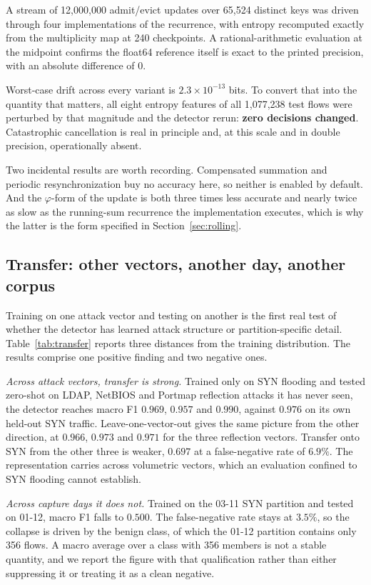\documentclass{ieeeaccess}
\begin{document}
A stream of 12{,}000{,}000 admit/evict updates over 65{,}524 distinct keys was
driven through four implementations of the recurrence, with entropy
recomputed exactly from the multiplicity map at 240 checkpoints. A rational-arithmetic evaluation at the
midpoint confirms the float64 reference itself is exact to the printed
precision, with an absolute difference of $0$.

Worst-case drift across every variant is $2.3\times10^{-13}$ bits. To convert
that into the quantity that matters, all eight entropy features of all
1{,}077{,}238 test flows were perturbed by that magnitude and the detector rerun:
\textbf{zero decisions changed}. Catastrophic cancellation is real in principle
and, at this scale and in double precision, operationally absent.

Two incidental results are worth recording. Compensated summation and periodic
resynchronization buy no accuracy here, so neither is enabled by default. And the $\varphi$-form of the update is both three times less accurate and
nearly twice as slow as the running-sum recurrence the implementation
executes, which is why the latter is the form specified in
Section~\ref{sec:rolling}.

\subsection{Transfer: other vectors, another day, another corpus}
\label{sec:crossvector}
\label{sec:crossdataset}
Training on one attack vector and testing on another is the first real test of
whether the detector has learned attack structure or partition-specific detail.
Table~\ref{tab:transfer} reports three distances from the training distribution.
The results comprise one positive finding and two negative ones.

\emph{Across attack vectors, transfer is strong.} Trained only on SYN flooding
and tested zero-shot on LDAP, NetBIOS and Portmap reflection attacks it has never
seen, the detector reaches macro F1 $0.969$, $0.957$ and $0.990$, against $0.976$
on its own held-out SYN traffic. Leave-one-vector-out gives the same picture from
the other direction, at $0.966$, $0.973$ and $0.971$ for the three reflection
vectors. Transfer onto SYN from the other three is weaker, $0.697$ at a
false-negative rate of $6.9\%$. The representation carries across volumetric vectors, which an evaluation
confined to SYN flooding cannot establish.

\emph{Across capture days it does not.} Trained on the 03-11 SYN partition and
tested on 01-12, macro F1 falls to $0.500$. The false-negative rate stays at
$3.5\%$, so the collapse is driven by the benign class, of which the 01-12
partition contains only 356 flows. A macro average over a class with 356 members
is not a stable quantity, and we report the figure with that qualification rather
than either suppressing it or treating it as a clean negative.
\end{document}
